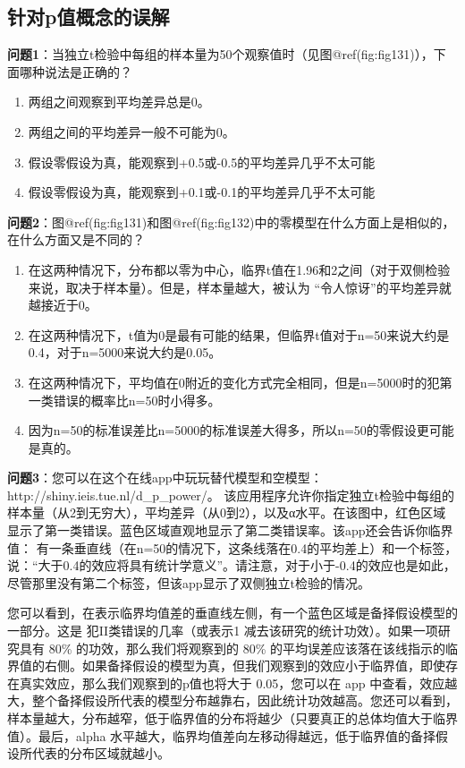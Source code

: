 \documentclass[
  letterpaper,
  DIV=11,
  numbers=noendperiod]{scrreprt}
\providecommand{\tightlist}{%
  \setlength{\itemsep}{0pt}\setlength{\parskip}{0pt}}\usepackage{longtable,booktabs,array}
\begin{document}
\hypertarget{ux9488ux5bf9pux503cux6982ux5ff5ux7684ux8befux89e3}{%
\subsection{针对p值概念的误解}\label{ux9488ux5bf9pux503cux6982ux5ff5ux7684ux8befux89e3}}

\textbf{问题1}：当独立t检验中每组的样本量为50个观察值时（见图@ref(fig:fig131)），下面哪种说法是正确的？

\begin{enumerate}
\def\labelenumi{\Alph{enumi})}
\tightlist
\item
  两组之间观察到平均差异总是0。
\item
  两组之间的平均差异一般不可能为0。
\item
  假设零假设为真，能观察到+0.5或-0.5的平均差异几乎不太可能
\item
  假设零假设为真，能观察到+0.1或-0.1的平均差异几乎不太可能
\end{enumerate}

\textbf{问题2}：图@ref(fig:fig131)和图@ref(fig:fig132)中的零模型在什么方面上是相似的，在什么方面又是不同的？

\begin{enumerate}
\def\labelenumi{\Alph{enumi})}
\tightlist
\item
  在这两种情况下，分布都以零为中心，临界t值在1.96和2之间（对于双侧检验来说，取决于样本量）。但是，样本量越大，被认为
  ``令人惊讶''的平均差异就越接近于0。
\item
  在这两种情况下，t值为0是最有可能的结果，但临界t值对于n=50来说大约是0.4，对于n=5000来说大约是0.05。
\item
  在这两种情况下，平均值在0附近的变化方式完全相同，但是n=5000时的犯第一类错误的概率比n=50时小得多。
\item
  因为n=50的标准误差比n=5000的标准误差大得多，所以n=50的零假设更可能是真的。
\end{enumerate}

\textbf{问题3}：您可以在这个在线app中玩玩替代模型和空模型：http://shiny.ieis.tue.nl/d\_p\_power/。
该应用程序允许你指定独立t检验中每组的样本量（从2到无穷大），平均差异（从0到2），以及α水平。在该图中，红色区域显示了第一类错误。蓝色区域直观地显示了第二类错误率。该app还会告诉你临界值：
有一条垂直线（在n=50的情况下，这条线落在0.4的平均差上）和一个标签，说：``大于0.4的效应将具有统计学意义''。请注意，对于小于-0.4的效应也是如此，尽管那里没有第二个标签，但该app显示了双侧独立t检验的情况。

您可以看到，在表示临界均值差的垂直线左侧，有一个蓝色区域是备择假设模型的一部分。这是
犯II类错误的几率（或表示1 减去该研究的统计功效）。如果一项研究具有 80\%
的功效，那么我们将观察到的 80\%
的平均误差应该落在该线指示的临界值的右侧。如果备择假设的模型为真，但我们观察到的效应小于临界值，即使存在真实效应，那么我们观察到的p值也将大于
0.05，您可以在 app
中查看，效应越大，整个备择假设所代表的模型分布越靠右，因此统计功效越高。您还可以看到，样本量越大，分布越窄，低于临界值的分布将越少（只要真正的总体均值大于临界值）。最后，alpha
水平越大，临界均值差向左移动得越远，低于临界值的备择假设所代表的分布区域就越小。
\end{document}
